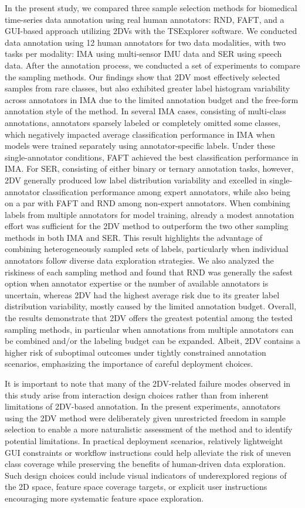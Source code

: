 \documentclass[a4paper,fleqn]{cas-dc}
\begin{document}
In the present study, we compared three sample selection methods for biomedical time-series data annotation using real human annotators: RND, FAFT, and a GUI-based approach utilizing 2DVs with the TSExplorer software. We conducted data annotation using 12 human annotators for two data modalities, with two tasks per modality: IMA using multi-sensor IMU data and SER using speech data. After the annotation process, we conducted a set of experiments to compare the sampling methods. Our findings show that 2DV most effectively selected samples from rare classes, but also exhibited greater label histogram variability across annotators in IMA due to the limited annotation budget and the free-form annotation style of the method. In several IMA cases, consisting of multi-class annotations, annotators sparsely labeled or completely omitted some classes, which negatively impacted average classification performance in IMA when models were trained separately using annotator-specific labels. Under these single-annotator conditions, FAFT achieved the best classification performance in IMA. For SER, consisting of either binary or ternary annotation tasks, however, 2DV generally produced low label distribution variability and excelled in single-annotator classification performance among expert annotators, while also being on a par with FAFT and RND among non-expert annotators. When combining labels from multiple annotators for model training, already a modest annotation effort was sufficient for the 2DV method to outperform the two other sampling methods in both IMA and SER. This result highlights the advantage of combining heterogeneously sampled sets of labels, particularly when individual annotators follow diverse data exploration strategies. We also analyzed the riskiness of each sampling method and found that RND was generally the safest option when annotator expertise or the number of available annotators is uncertain, whereas 2DV had the highest average risk due to its greater label distribution variability, mostly caused by the limited annotation budget. Overall, the results demonstrate that 2DV offers the greatest potential among the tested sampling methods, in particular when annotations from multiple annotators can be combined and/or the labeling budget can be expanded. Albeit, 2DV contains a higher risk of suboptimal outcomes under tightly constrained annotation scenarios, emphasizing the importance of careful deployment choices.

It is important to note that many of the 2DV-related failure modes observed in this study arise from interaction design choices rather than from inherent limitations of 2DV-based annotation. In the present experiments, annotators using the 2DV method were deliberately given unrestricted freedom in sample selection to enable a more naturalistic assessment of the method and to identify potential limitations. In practical deployment scenarios, relatively lightweight GUI constraints or workflow instructions could help alleviate the risk of uneven class coverage while preserving the benefits of human-driven data exploration. Such design choices could include visual indicators of underexplored regions of the 2D space, feature space coverage targets, or explicit user instructions encouraging more systematic feature space exploration.
\end{document}
